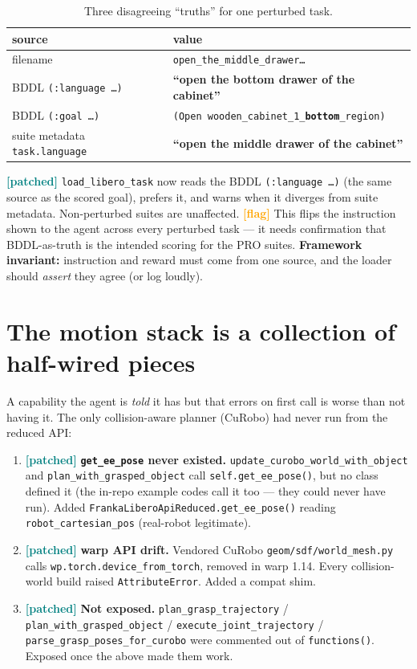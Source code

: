 \documentclass[11pt]{article}
\newcommand{\patched}{\textcolor{teal}{\textbf{[patched]}}}
\newcommand{\flag}{\textcolor{orange}{\textbf{[flag]}}}
\newcommand{\code}[1]{\texttt{#1}}
\begin{document}
\begin{table}[h]\centering
\begin{tabular}{ll}
\toprule
source & value \\
\midrule
filename & \code{open\_the\_middle\_drawer\dots} \\
BDDL \code{(:language \dots)} & \textbf{``open the bottom drawer of the cabinet''} \\
BDDL \code{(:goal \dots)} & \code{(Open wooden\_cabinet\_1\_\textbf{bottom}\_region)} \\
suite metadata \code{task.language} & \textbf{``open the middle drawer of the cabinet''} \\
\bottomrule
\end{tabular}
\caption{Three disagreeing ``truths'' for one perturbed task.}
\label{tab:contract}
\end{table}

\noindent\patched{} \code{load\_libero\_task} now reads the BDDL \code{(:language \dots)}
(the same source as the scored goal), prefers it, and warns when it diverges from suite
metadata. Non-perturbed suites are unaffected. \flag{} This flips the instruction shown to
the agent across every perturbed task --- it needs confirmation that BDDL-as-truth is the
intended scoring for the PRO suites. \textbf{Framework invariant:} instruction and reward
must come from one source, and the loader should \emph{assert} they agree (or log loudly).

\section{The motion stack is a collection of half-wired pieces}
A capability the agent is \emph{told} it has but that errors on first call is worse than not
having it. The only collision-aware planner (CuRobo) had never run from the reduced API:

\begin{enumerate}
  \item \patched{} \textbf{\code{get\_ee\_pose} never existed.}
        \code{update\_curobo\_world\_with\_object} and \code{plan\_with\_grasped\_object}
        call \code{self.get\_ee\_pose()}, but no class defined it (the in-repo example codes
        call it too --- they could never have run). Added
        \code{FrankaLiberoApiReduced.get\_ee\_pose()} reading \code{robot\_cartesian\_pos}
        (real-robot legitimate).
  \item \patched{} \textbf{warp API drift.} Vendored CuRobo
        \code{geom/sdf/world\_mesh.py} calls \code{wp.torch.device\_from\_torch}, removed in
        warp 1.14. Every collision-world build raised \code{AttributeError}. Added a compat
        shim.
  \item \patched{} \textbf{Not exposed.} \code{plan\_grasp\_trajectory} /
        \code{plan\_with\_grasped\_object} / \code{execute\_joint\_trajectory} /
        \code{parse\_grasp\_poses\_for\_curobo} were commented out of \code{functions()}.
        Exposed once the above made them work.
\end{enumerate}
\end{document}
